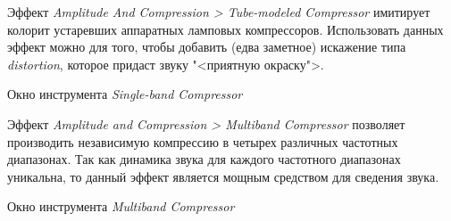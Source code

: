 \documentclass{beamer}
\begin{document}
\begin{frame}
  Эффект \emph{Amplitude And Compression > Tube-modeled Compressor} имитирует колорит устаревших аппаратных ламповых компрессоров. Использовать данных эффект можно для того, чтобы добавить (едва заметное) искажение типа \emph{distortion}, которое придаст звуку "<приятную окраску">.

  \begin{block}{Окно инструмента \emph{Single-band Compressor}}
  \end{block}
\end{frame}

\begin{frame}
  Эффект \emph{Amplitude and Compression > Multiband Compressor} позволяет производить независимую компрессию в четырех различных частотных диапазонах. Так как динамика звука для каждого частотного диапазонах уникальна, то данный эффект является мощным средством для сведения звука.

  \begin{block}{Окно инструмента \emph{Multiband Compressor}}
  \end{block}
\end{frame}
\end{document}
